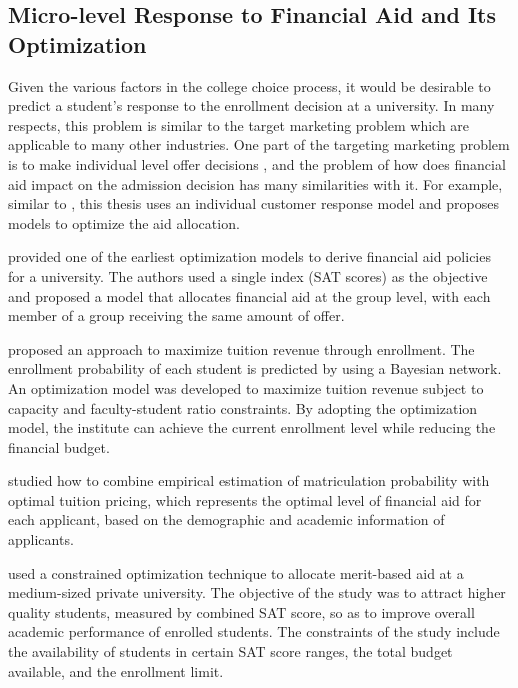 \documentclass[12pt,english]{report}
\begin{document}
\subsection{Micro-level Response to Financial Aid and Its Optimization} 
Given the various factors in the college choice process, it would be desirable to predict a student's response to the enrollment decision at a university.  In many respects, this problem is similar to the target marketing problem which are applicable to many other industries. One part of the targeting marketing problem is to make individual level offer decisions \citep{Venkatesan2004}, and the problem of how does financial aid impact on the admission decision has many similarities with it.  For example, similar to \citep{Carter2011}, this thesis uses an individual customer response model and proposes  models to optimize the aid allocation.

\vspace{0.15in}

\citet{Ehrenberg1984} provided one of the earliest optimization models to derive financial aid policies for a university. The authors used a single index (SAT scores) as the objective and proposed a model that allocates financial aid at the group level, with each member of a group receiving the same amount of offer. 

\citet{Thanh2007} proposed an approach to maximize tuition revenue  through enrollment. The enrollment probability  of each student is predicted by using a Bayesian network.  An optimization model was developed to  maximize  tuition revenue subject to capacity and faculty-student ratio constraints. By adopting the optimization model, the institute  can achieve the current enrollment level while reducing the financial budget.

\citet{Bosshardt2010} studied how to combine empirical estimation of matriculation probability with optimal tuition pricing, which represents the optimal level of financial aid for each applicant, based on the demographic  and academic information of applicants.

\citet{Sugrue2010} used a constrained optimization technique to allocate merit-based aid at a medium-sized private university. The objective of the study was to attract higher quality students, measured by combined SAT score,  so as to improve overall academic performance of enrolled students. The constraints of the study include the availability of students in certain SAT score ranges, the total budget available, and the enrollment limit.
\end{document}

